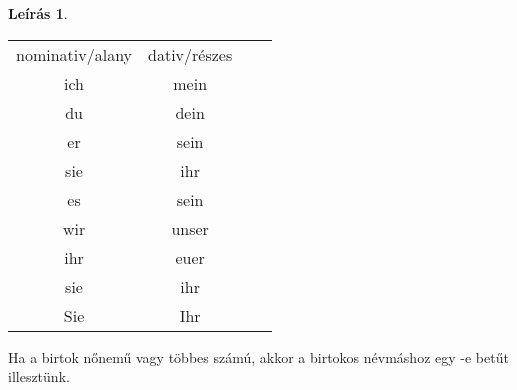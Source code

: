 \documentclass{article}
\theoremstyle{definition}
\newtheorem*{desc}{Leírás}
\begin{document}
\begin{desc}
\begin{tabular}{cccc}
 nominativ/alany & dativ/részes \\
 ich & mein\\
 du & dein\\
 er & sein\\
 sie & ihr\\
 es & sein\\
 wir & unser\\
 ihr & euer\\
 sie & ihr\\
 Sie & Ihr\\
\end{tabular}

Ha a birtok nőnemű vagy többes számú, akkor a birtokos névmáshoz
egy -e betűt illesztünk.
\end{desc}
\end{document}

